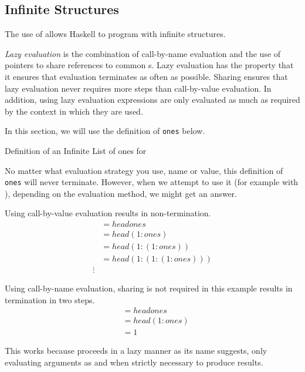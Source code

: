 \subsection{Infinite Structures}\label{subsec:Infinite_Structures}
The use of  allows Haskell to program with infinite structures.

\begin{definition}\label{def:Lazy_Evaluation}
  \emph{Lazy evaluation} is the combination of call-by-name evaluation and the use of pointers to share references to common s.
  Lazy evaluation has the property that it ensures that evaluation terminates as often as possible.
  Sharing ensures that lazy evaluation never requires more steps than call-by-value evaluation.
  In addition, using lazy evaluation expressions are only evaluated as much as required by the context in which they are used.
\end{definition}

In this section, we will use the definition of \texttt{ones} below.
\begin{listing}[h!tbp]
\caption{Definition of an Infinite List of ones for }
\label{lst:Ones_Definition}
\end{listing}

No matter what evaluation strategy you use, name or value, this definition of \texttt{ones} will never terminate.
However, when we attempt to use it (for example with ), depending on the evaluation method, we might get an answer.

Using call-by-value evaluation results in non-termination.
\begin{align*}
  &= head ones \\
  &= head (1 : ones) \\
  &= head (1 : (1 : ones)) \\
  &= head (1 : (1 : (1 : ones))) \\
  \vdots
\end{align*}

Using call-by-name evaluation, sharing is not required in this example results in termination in two steps.
\begin{align*}
  &= head ones \\
  &= head (1 : ones) \\
  &= 1
\end{align*}

This works because  proceeds in a lazy manner as its name suggests, only evaluating arguments as and when strictly necessary to produce results.

